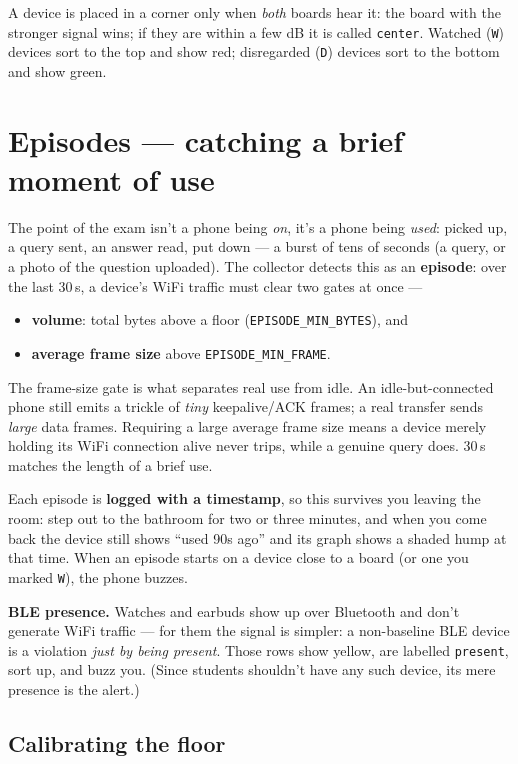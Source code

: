 \documentclass[11pt]{article}
\begin{document}
A device is placed in a corner only when \emph{both} boards hear it: the board
with the stronger signal wins; if they are within a few dB it is called
\texttt{center}. Watched (\texttt{W}) devices sort to the top and show red;
disregarded (\texttt{D}) devices sort to the bottom and show green.

\section{Episodes --- catching a brief moment of use}

The point of the exam isn't a phone being \emph{on}, it's a phone being
\emph{used}: picked up, a query sent, an answer read, put down --- a burst of
tens of seconds (a query, or a photo of the question uploaded). The collector
detects this as an \textbf{episode}: over the last 30\,s, a device's WiFi traffic
must clear two gates at once ---
\begin{itemize}
  \item \textbf{volume}: total bytes above a floor (\texttt{EPISODE\_MIN\_BYTES}), and
  \item \textbf{average frame size} above \texttt{EPISODE\_MIN\_FRAME}.
\end{itemize}
The frame-size gate is what separates real use from idle. An idle-but-connected
phone still emits a trickle of \emph{tiny} keepalive/ACK frames; a real transfer
sends \emph{large} data frames. Requiring a large average frame size means a
device merely holding its WiFi connection alive never trips, while a genuine
query does. 30\,s matches the length of a brief use.

Each episode is \textbf{logged with a timestamp}, so this survives you leaving
the room: step out to the bathroom for two or three minutes, and when you come
back the device still shows ``used 90s ago'' and its graph shows a shaded hump at
that time. When an episode starts on a device close to a board (or one you marked
\texttt{W}), the phone buzzes.

\textbf{BLE presence.} Watches and earbuds show up over Bluetooth and don't
generate WiFi traffic --- for them the signal is simpler: a non-baseline BLE
device is a violation \emph{just by being present}. Those rows show yellow, are
labelled \texttt{present}, sort up, and buzz you. (Since students shouldn't have
any such device, its mere presence is the alert.)

\subsection*{Calibrating the floor}
\end{document}
